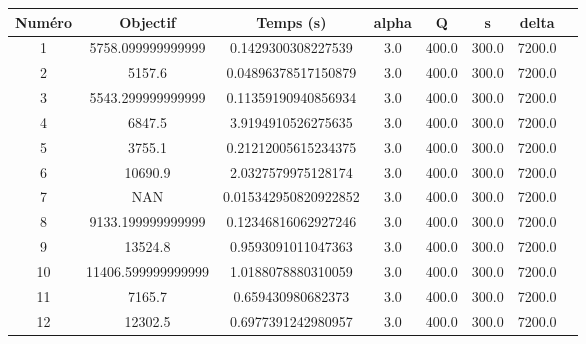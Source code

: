 \begin{tabular}{|c|c|c|c|c|c|c|c|}
\hline
 Numéro & Objectif & Temps (s) & alpha & Q & s & delta \\
\hline
1 & 5758.099999999999 & 0.1429300308227539 & 3.0 & 400.0 & 300.0 & 7200.0 \\ 
 \hline
2 & 5157.6 & 0.04896378517150879 & 3.0 & 400.0 & 300.0 & 7200.0 \\ 
 \hline
3 & 5543.299999999999 & 0.11359190940856934 & 3.0 & 400.0 & 300.0 & 7200.0 \\ 
 \hline
4 & 6847.5 & 3.9194910526275635 & 3.0 & 400.0 & 300.0 & 7200.0 \\ 
 \hline
5 & 3755.1 & 0.21212005615234375 & 3.0 & 400.0 & 300.0 & 7200.0 \\ 
 \hline
6 & 10690.9 & 2.0327579975128174 & 3.0 & 400.0 & 300.0 & 7200.0 \\ 
 \hline
7 & NAN & 0.015342950820922852 & 3.0 & 400.0 & 300.0 & 7200.0 \\ 
 \hline
8 & 9133.199999999999 & 0.12346816062927246 & 3.0 & 400.0 & 300.0 & 7200.0 \\ 
 \hline
9 & 13524.8 & 0.9593091011047363 & 3.0 & 400.0 & 300.0 & 7200.0 \\ 
 \hline
10 & 11406.599999999999 & 1.0188078880310059 & 3.0 & 400.0 & 300.0 & 7200.0 \\ 
 \hline
11 & 7165.7 & 0.659430980682373 & 3.0 & 400.0 & 300.0 & 7200.0 \\ 
 \hline
12 & 12302.5 & 0.6977391242980957 & 3.0 & 400.0 & 300.0 & 7200.0 \\ 
 \hline
\end{tabular}
